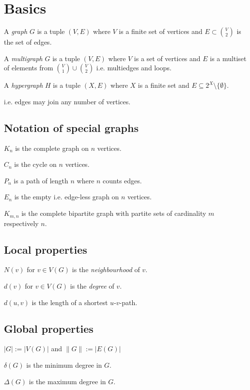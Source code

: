 \section*{Basics}

A \emph{graph} $G$ is a tuple $(V,E)$ where $V$ is a finite set of vertices and $E \subset {V \choose 2}$ is the set of edges.

\spacing

A \emph{multigraph} $G$ is a tuple $(V,E)$ where $V$ is a set of vertices and $E$ is a multiset of elements from ${V \choose 1} \cup {V \choose 2}$ i.e. multiedges and loops.

\spacing

A \emph{hypergraph} $H$ is a tuple $(X,E)$ where $X$ is a finite set and $E \subseteq 2^X \setminus \{\emptyset\}$.

i.e. edges may join any number of vertices.


\subsection*{Notation of special graphs}

$K_n$ is the complete graph on $n$ vertices.

$C_n$ is the cycle on $n$ vertices.

$P_n$ is a path of length $n$ where $n$ counts edges.

$E_n$ is the empty i.e. edge-less graph on $n$ vertices.

$K_{m,n}$ is the complete bipartite graph with partite sets of cardinality $m$ respectively $n$.

\subsection*{Local properties}

$N(v)$ for $v \in V(G)$ is the \emph{neighbourhood} of $v$.

$d(v)$ for $v \in V(G)$ is the \emph{degree} of $v$.

$d(u,v)$ is the length of a shortest $u$-$v$-path.

\subsection*{Global properties}

$|G| := |V(G)|$ and $\|G\| := |E(G)|$

$\delta(G)$ is the minimum degree in $G$.

$\Delta(G)$ is the maximum degree in $G$.


